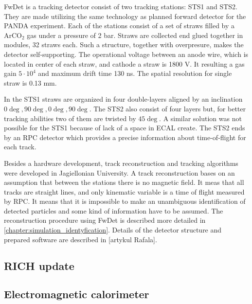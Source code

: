 FwDet is a tracking detector consist of two tracking stations: STS1 and STS2. They are made utilizing the same technology as planned forward detector for the PANDA experiment. Each of the stations consist of a set of straws filled by a ArCO$_2$ gas under a pressure of 2 bar. Straws are collected end glued together in modules, 32 straws each. Such a structure, together with overpresure, makes the detector self-supporting. The operational voltage between an anode wire, which is located in center of each straw, and cathode a straw is 1800 V. It resulting a gas gain $5 \cdot 10^4$ and maximum drift time 130 ns. The spatial resolution for single straw is 0.13 mm.

In the STS1 straws are organized in four double-layers aligned by an inclination $0\deg, 90\deg, 0\deg, 90\deg$. The STS2 also consist of four layers but, for better tracking abilities two of them are twisted by $45\deg$. A similar solution was not possible for the STS1 because of lack of a space in ECAL create. The STS2 ends by an RPC detector which provides a precise information about time-of-flight for each track.

Besides a hardware development, track reconstruction and tracking algorithms were developed in Jagiellonian University. A track reconstruction bases on an assumption that between the stations there is no magnetic field. It meas that all tracks are straight lines, and only kinematic variable is a time of flight measured by RPC. It means that it is impossible to make an unambiguous identification of detected particles and some kind of information have to be assumed. The reconstruction procedure using FwDet is described more detailed in \ref{chapter:simulation_identyfication}. Details of the detector structure and prepared software are described in [artykul Rafala]. 
\subsection{RICH update}

\subsection{Electromagnetic calorimeter}

